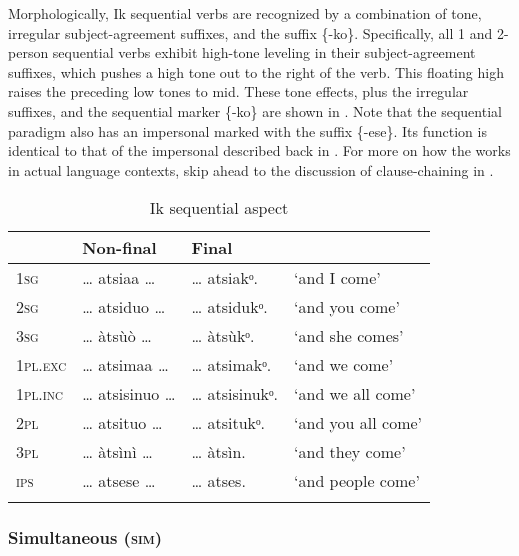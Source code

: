 Morphologically, Ik sequential verbs are recognized by a combination of tone, irregular subject-agreement suffixes, and the  suffix \{-ko\}. Specifically, all 1 and 2-person sequential verbs exhibit high-tone leveling in their subject-agreement suffixes, which pushes a high tone out to the right of the verb. This floating high raises the preceding low tones to mid. These tone effects, plus the irregular suffixes, and the sequential marker \{-ko\} are shown in . Note that the sequential paradigm also has an impersonal  marked with the suffix \{-ese\}. Its function is identical to that of the impersonal  described back in . For more on how the  works in actual language contexts, skip ahead to the discussion of clause-chaining in .


\begin{table}
\caption{Ik sequential aspect}
\label{tab:verbs:seq}


\begin{tabularx}{\textwidth}{XXXl}
\lsptoprule

& Non-final & Final & \\
\midrule
\textsc{1sg} & {\dots} atsiaa {\dots} & {\dots} atsiakᵒ. & ‘and I come’\\
\textsc{2sg} & {\dots} atsiduo {\dots} & {\dots} atsidukᵒ. & ‘and you come’\\
\textsc{3sg} & {\dots} àtsùò {\dots} & {\dots} àtsùkᵒ. & ‘and she comes’\\
\textsc{1pl.exc} & {\dots} atsimaa {\dots} & {\dots} atsimakᵒ. & ‘and we come’\\
\textsc{1pl.inc} & {\dots} atsisinuo {\dots} & {\dots} atsisinukᵒ. & ‘and we all come’\\
\textsc{2pl} & {\dots} atsituo {\dots} & {\dots} atsitukᵒ. & ‘and you all come’\\
\textsc{3pl} & {\dots} àtsìnì {\dots} & {\dots} àtsìn. & ‘and they come’\\
\textsc{ips} & {\dots} atsese {\dots} & {\dots} atses. & ‘and people come’\\
\lspbottomrule
\end{tabularx}
\end{table}



\subsubsection{Simultaneous (\textsc{sim})}\label{sec:8.10.8}

